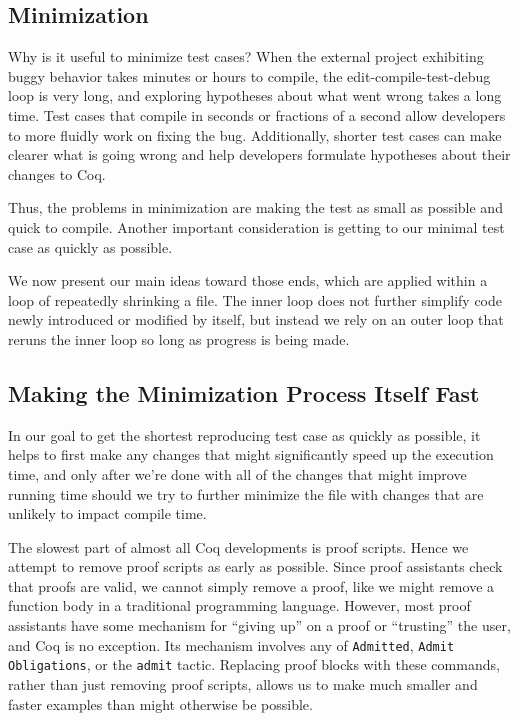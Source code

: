 \documentclass[a4paper,USenglish,cleveref,autoref,thm-restate]{lipics-v2021}
\begin{document}
\subsection{Minimization}

Why is it useful to minimize test cases?
When the external project exhibiting buggy behavior takes minutes or hours to compile, the edit-compile-test-debug loop is very long, and exploring hypotheses about what went wrong takes a long time.
Test cases that compile in seconds or fractions of a second allow developers to more fluidly work on fixing the bug.
Additionally, shorter test cases can make clearer what is going wrong and help developers formulate hypotheses about their changes to Coq.

Thus, the problems in minimization are making the test as small as possible and quick to compile.
Another important consideration is getting to our minimal test case as quickly as possible.

We now present our main ideas toward those ends, which are applied within a loop of repeatedly shrinking a file.
The inner loop does not further simplify code newly introduced or modified by itself, but instead we rely on an outer loop that reruns the inner loop so long as progress is being made.

\subsection{Making the Minimization Process Itself Fast}

In our goal to get the shortest reproducing test case as quickly as possible, it helps to first make any changes that might significantly speed up the execution time, and only after we're done with all of the changes that might improve running time should we try to further minimize the file with changes that are unlikely to impact compile time.

The slowest part of almost all Coq developments is proof scripts.
Hence we attempt to remove proof scripts as early as possible.
Since proof assistants check that proofs are valid, we cannot simply remove a proof, like we might remove a function body in a traditional programming language.
However, most proof assistants have some mechanism for ``giving up'' on a proof or ``trusting'' the user, and Coq is no exception.
Its mechanism involves any of \verb|Admitted|, \verb|Admit Obligations|, or the \verb|admit| tactic.
Replacing proof blocks with these commands, rather than just removing proof scripts, allows us to make much smaller and faster examples than might otherwise be possible.
\end{document}
